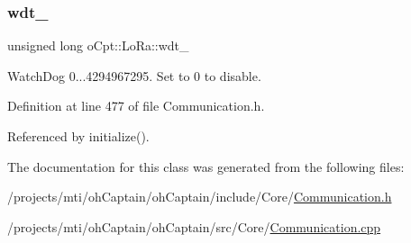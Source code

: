 \subsubsection{\texorpdfstring{wdt\+\_\+}{wdt\_}}
{\footnotesize\ttfamily unsigned long o\+Cpt\+::\+Lo\+Ra\+::wdt\+\_\+\hspace{0.3cm}{\ttfamily [protected]}}



Watch\+Dog 0...4294967295. Set to 0 to disable. 



Definition at line 477 of file Communication.\+h.



Referenced by initialize().



The documentation for this class was generated from the following files\+:\begin{DoxyCompactItemize}
\item 
/projects/mti/oh\+Captain/oh\+Captain/include/\+Core/\hyperlink{_communication_8h}{Communication.\+h}\item 
/projects/mti/oh\+Captain/oh\+Captain/src/\+Core/\hyperlink{_communication_8cpp}{Communication.\+cpp}\end{DoxyCompactItemize}
